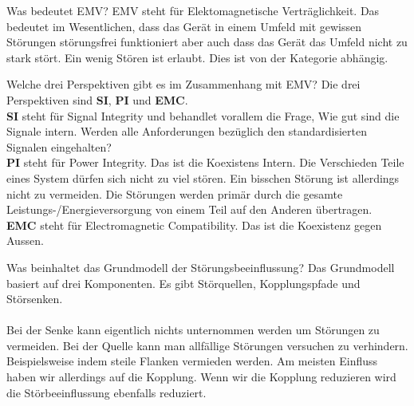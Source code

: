 
\begin{karte}{Was bedeutet EMV?}
	EMV steht für Elektomagnetische Verträglichkeit. Das bedeutet im Wesentlichen, dass das Gerät in einem Umfeld mit gewissen Störungen störungsfrei funktioniert aber auch dass das Gerät das Umfeld nicht zu stark stört. Ein wenig Stören ist erlaubt. Dies ist von der Kategorie abhängig.
\end{karte}

\begin{karte}{Welche drei Perspektiven gibt es im Zusammenhang mit EMV?}
	Die drei Perspektiven sind \textbf{SI}, \textbf{PI} und \textbf{EMC}.\\[5pt]
	\textbf{SI} steht für Signal Integrity und behandlet vorallem die Frage, Wie gut sind die Signale intern. Werden alle Anforderungen bezüglich den standardisierten Signalen eingehalten?\\[5pt]
	\textbf{PI} steht für Power Integrity. Das ist die Koexistens Intern. Die Verschieden Teile eines System dürfen sich nicht zu viel stören. Ein bisschen Störung ist allerdings nicht zu vermeiden. Die Störungen werden primär durch die gesamte Leistungs-/Energieversorgung von einem Teil auf den Anderen übertragen.\\[5pt]
	\textbf{EMC} steht für Electromagnetic Compatibility. Das ist die Koexistenz gegen Aussen.
\end{karte}

\begin{karte}{Was beinhaltet das Grundmodell der Störungsbeeinflussung?}
	Das Grundmodell basiert auf drei Komponenten. Es gibt Störquellen, Kopplungspfade und Störsenken.\\
	\\[5pt]
	Bei der Senke kann eigentlich nichts unternommen werden um Störungen zu vermeiden. Bei der Quelle kann man allfällige Störungen versuchen zu verhindern. Beispielsweise indem steile Flanken vermieden werden. Am meisten Einfluss haben wir allerdings auf die Kopplung. Wenn wir die Kopplung reduzieren wird die Störbeeinflussung ebenfalls reduziert.
\end{karte}

